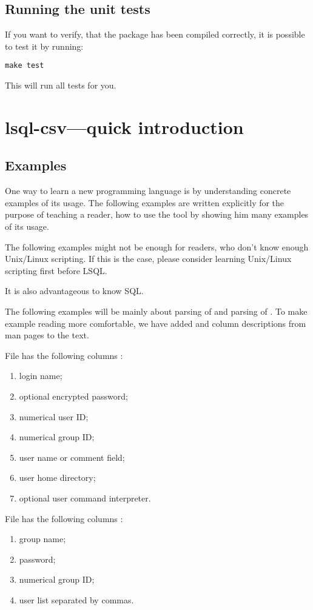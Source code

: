 \subsection{Running the unit tests}
If you want to verify, that the package has been compiled correctly, it is possible to test it by running:
\begin{verbatim}
make test
\end{verbatim}
This will run all tests for you.

\section{lsql-csv---quick introduction}

\subsection{Examples}
One way to learn a new programming language is by understanding concrete examples of its usage. The following examples are written explicitly for the purpose of teaching a reader, how to use the tool  by showing him many examples of its usage.

The following examples might not be enough for readers, who don't know enough Unix/Linux scripting. If this is the case, please consider learning Unix/\allowbreak Linux scripting first before LSQL.

It is also advantageous to know SQL.

The following examples will be mainly about parsing of  and parsing of . To make example reading more comfortable, we have added  and  column descriptions from man pages to the text.

File  has the following columns \cite{passwd}:
\begin{enumerate}
    \item login name;
    \item optional encrypted password;
    \item numerical user ID;
    \item numerical group ID;    
    \item user name or comment field;
    \item user home directory;
    \item optional user command interpreter.
\end{enumerate}
File  has the following columns \cite{group}:
\begin{enumerate}
    \item group name;
    \item password;
    \item numerical group ID;
    \item user list separated by commas.
\end{enumerate}


